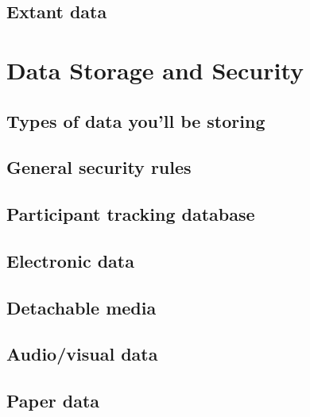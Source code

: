 \documentclass[
]{book}
\begin{document}
\hypertarget{extant-data}{%
\section{Extant data}\label{extant-data}}

\hypertarget{data-storage-and-security}{%
\chapter{Data Storage and Security}\label{data-storage-and-security}}

\hypertarget{types-of-data-youll-be-storing}{%
\section{Types of data you'll be storing}\label{types-of-data-youll-be-storing}}

\hypertarget{general-security-rules}{%
\section{General security rules}\label{general-security-rules}}

\hypertarget{participant-tracking-database}{%
\section{Participant tracking database}\label{participant-tracking-database}}

\hypertarget{electronic-data}{%
\section{Electronic data}\label{electronic-data}}

\hypertarget{detachable-media}{%
\section{Detachable media}\label{detachable-media}}

\hypertarget{audiovisual-data}{%
\section{Audio/visual data}\label{audiovisual-data}}

\hypertarget{paper-data}{%
\section{Paper data}\label{paper-data}}
\end{document}

